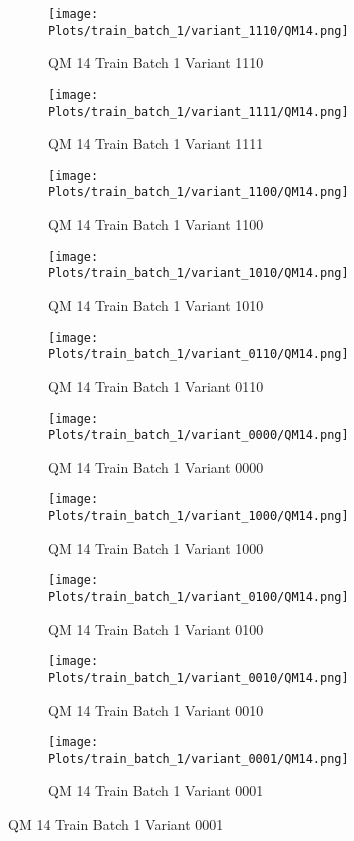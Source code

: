 \documentclass{DissertateFigs}
\begin{document}
\begin{figure}[t!]
    \begin{subfigure}{0.47\textwidth}
    \texttt{[image: Plots/train\_batch\_1/variant\_1110/QM14.png]}
    \caption{QM 14 Train Batch 1 Variant 1110}
    \end{subfigure}
    \begin{subfigure}{0.47\textwidth}
    \texttt{[image: Plots/train\_batch\_1/variant\_1111/QM14.png]}
    \caption{QM 14 Train Batch 1 Variant 1111}
    \end{subfigure}

\medskip

    \begin{subfigure}{0.47\textwidth}
    \texttt{[image: Plots/train\_batch\_1/variant\_1100/QM14.png]}
    \caption{QM 14 Train Batch 1 Variant 1100}
    \end{subfigure}
    \begin{subfigure}{0.47\textwidth}
    \texttt{[image: Plots/train\_batch\_1/variant\_1010/QM14.png]}
    \caption{QM 14 Train Batch 1 Variant 1010}
    \end{subfigure}

\medskip

    \begin{subfigure}{0.47\textwidth}
    \texttt{[image: Plots/train\_batch\_1/variant\_0110/QM14.png]}
    \caption{QM 14 Train Batch 1 Variant 0110}
    \end{subfigure}
    \begin{subfigure}{0.47\textwidth}
    \texttt{[image: Plots/train\_batch\_1/variant\_0000/QM14.png]}
    \caption{QM 14 Train Batch 1 Variant 0000}
    \end{subfigure}

\medskip

    \begin{subfigure}{0.47\textwidth}
    \texttt{[image: Plots/train\_batch\_1/variant\_1000/QM14.png]}
    \caption{QM 14 Train Batch 1 Variant 1000}
    \end{subfigure}
    \begin{subfigure}{0.47\textwidth}
    \texttt{[image: Plots/train\_batch\_1/variant\_0100/QM14.png]}
    \caption{QM 14 Train Batch 1 Variant 0100}
    \end{subfigure}

\medskip

    \begin{subfigure}{0.47\textwidth}
    \texttt{[image: Plots/train\_batch\_1/variant\_0010/QM14.png]}
    \caption{QM 14 Train Batch 1 Variant 0010}
    \end{subfigure}
    \begin{subfigure}{0.47\textwidth}
    \texttt{[image: Plots/train\_batch\_1/variant\_0001/QM14.png]}
    \caption{QM 14 Train Batch 1 Variant 0001}
    \end{subfigure}


\end{figure}
\end{document}
